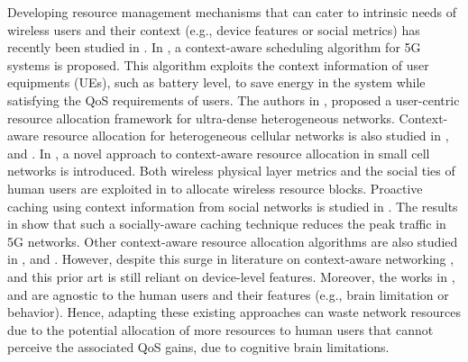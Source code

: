 \documentclass[journal,draftclsnofoot,onecolumn,12pt]{IEEEtran}%
\begin{document}
	
	Developing resource management mechanisms that can cater to intrinsic needs of wireless users and their context (e.g., device features or social metrics) has recently been studied in \cite{Alam2016,Lin2017TVT,Letter2017Context,semiari2015context,WCNC2017context,bennis2014proactive,makris2013survey,Yuen2011Location,proebster2011context}. In \cite{Alam2016}, a context-aware scheduling algorithm for 5G systems is proposed. This algorithm exploits the context information of user equipments (UEs), such as battery level, to save energy in the system while satisfying the QoS requirements of users. The authors in \cite{Lin2017TVT}, proposed a user-centric resource allocation framework for ultra-dense heterogeneous networks.
    Context-aware resource allocation for heterogeneous cellular networks is also studied in \cite{Letter2017Context,semiari2015context}, and \cite{WCNC2017context}.
	In \cite{semiari2015context}, a novel approach to context-aware resource allocation in small cell networks is introduced. Both wireless physical layer metrics and the social ties of human users are exploited in \cite{semiari2015context} to allocate wireless resource blocks.  
	Proactive caching  using context information from social networks is studied in \cite{bennis2014proactive}. The results in \cite{bennis2014proactive} show that such a socially-aware caching technique reduces the peak traffic in 5G networks. Other context-aware resource allocation algorithms are also studied in 
	\cite{makris2013survey,perera2014context}, and \cite{proebster2011context}.
	{However, despite this surge in literature on context-aware networking \cite{Alam2016,semiari2015context,bennis2014proactive,makris2013survey,Letter2017Context,WCNC2017context,Lin2017TVT,proebster2011context}, and \cite{perera2014context} this  prior art is still reliant on device-level features. Moreover, the works in \cite{Alam2016,semiari2015context,bennis2014proactive,makris2013survey,Letter2017Context,WCNC2017context,Lin2017TVT,proebster2011context}, and \cite{perera2014context} are agnostic to the human users and their features (e.g., brain limitation or behavior). Hence, adapting these existing approaches can waste network resources {due to the potential allocation of} more resources to human users that cannot perceive the associated QoS gains, due to cognitive brain limitations.}
	
	
	
\end{document}
